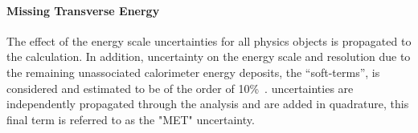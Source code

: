 \paragraph{Missing Transverse Energy}
The effect of the energy scale uncertainties for all  physics objects is propagated to the \met calculation.
In addition, uncertainty on the energy scale and resolution due to the remaining unassociated 
calorimeter energy deposits, the ``soft-terms'', is considered and estimated to be of the order of 10\%~\cite{ETMISS}. 
\met uncertainties are independently propagated through the analysis and are
added in quadrature, this final term is referred to as the "MET" uncertainty.


